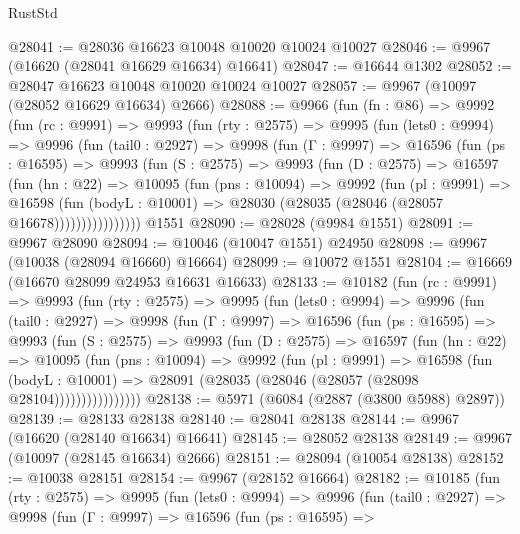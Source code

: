 \begin{lexlean}{RustStd}
\begin{coremodule}
@28041 := @28036 @16623 @10048 @10020 @10024 @10027
@28046 := @9967 (@16620 (@28041 @16629 @16634) @16641)
@28047 := @16644 @1302
@28052 := @28047 @16623 @10048 @10020 @10024 @10027
@28057 := @9967 (@10097 (@28052 @16629 @16634) @2666)
@28088 := @9966
    (fun (fn : @86) =>
    @9992
      (fun (rc : @9991) =>
      @9993
        (fun (rty : @2575) =>
        @9995
          (fun (lets0 : @9994) =>
          @9996
            (fun (tail0 : @2927) =>
            @9998
              (fun (Γ : @9997) =>
              @16596
                (fun (ps : @16595) =>
                @9993
                  (fun (S : @2575) =>
                  @9993
                    (fun (D : @2575) =>
                    @16597
                      (fun (hn : @22) =>
                      @10095
                        (fun (pns : @10094) =>
                        @9992
                          (fun (pl : @9991) =>
                          @16598
                            (fun (bodyL : @10001) =>
                            @28030 (@28035 (@28046 (@28057 @16678))))))))))))))))
    @1551
@28090 := @28028 (@9984 @1551)
@28091 := @9967 @28090
@28094 := @10046 (@10047 @1551) @24950
@28098 := @9967 (@10038 (@28094 @16660) @16664)
@28099 := @10072 @1551
@28104 := @16669 (@16670 @28099 @24953 @16631 @16633)
@28133 := @10182
    (fun (rc : @9991) =>
    @9993
      (fun (rty : @2575) =>
      @9995
        (fun (lets0 : @9994) =>
        @9996
          (fun (tail0 : @2927) =>
          @9998
            (fun (Γ : @9997) =>
            @16596
              (fun (ps : @16595) =>
              @9993
                (fun (S : @2575) =>
                @9993
                  (fun (D : @2575) =>
                  @16597
                    (fun (hn : @22) =>
                    @10095
                      (fun (pns : @10094) =>
                      @9992
                        (fun (pl : @9991) =>
                        @16598
                          (fun (bodyL : @10001) =>
                          @28091 (@28035 (@28046 (@28057 (@28098 @28104))))))))))))))))
@28138 := @5971 (@6084 (@2887 (@3800 @5988) @2897))
@28139 := @28133 @28138
@28140 := @28041 @28138
@28144 := @9967 (@16620 (@28140 @16634) @16641)
@28145 := @28052 @28138
@28149 := @9967 (@10097 (@28145 @16634) @2666)
@28151 := @28094 (@10054 @28138)
@28152 := @10038 @28151
@28154 := @9967 (@28152 @16664)
@28182 := @10185
    (fun (rty : @2575) =>
    @9995
      (fun (lets0 : @9994) =>
      @9996
        (fun (tail0 : @2927) =>
        @9998
          (fun (Γ : @9997) =>
          @16596
            (fun (ps : @16595) =>

\end{coremodule}
\end{lexlean}

